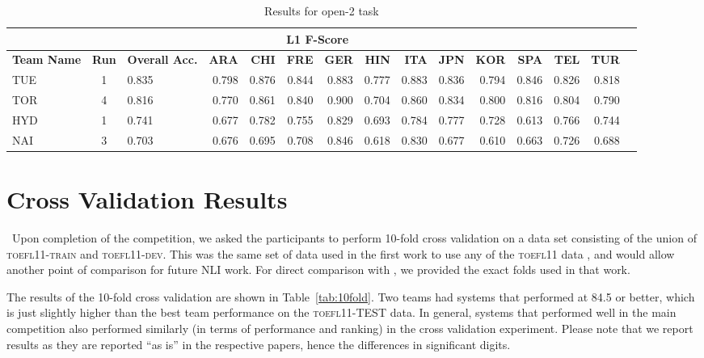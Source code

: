 \documentclass[11pt,letterpaper]{article}
\begin{document}
\begin{table*}
\begin{footnotesize}
\begin{tabular}{|p{1cm}|c|p{1cm}|r|r|r|r|r|r|r|r|r|r|r|r|}
\hline
\rowcolor{gray!50}
\multicolumn{3}{|c|}{} & \multicolumn{11}{c|}{\bf L1 F-Score}\\\hline
{\bf Team Name} & {\bf Run} & {\bf Overall Acc.} & {\bf ARA} & {\bf CHI} & {\bf FRE} & {\bf GER} & {\bf HIN} & {\bf ITA} & {\bf JPN} & {\bf KOR} & {\bf SPA} & {\bf TEL} & {\bf TUR}\\\hline
TUE & 1  & 0.835 & 0.798 & 0.876 & 0.844 & 0.883 & 0.777 & 0.883 & 0.836 & 0.794 & 0.846 & 0.826 & 0.818\\\hline
TOR& 4  & 0.816 & 0.770 & 0.861 & 0.840 & 0.900 & 0.704 & 0.860 & 0.834 & 0.800 & 0.816 & 0.804 & 0.790\\\hline
HYD & 1  & 0.741 & 0.677 & 0.782 & 0.755 & 0.829 & 0.693 & 0.784 & 0.777 & 0.728 & 0.613 & 0.766 & 0.744\\\hline
NAI & 3  & 0.703 & 0.676 & 0.695 & 0.708 & 0.846 & 0.618 & 0.830 & 0.677 & 0.610 & 0.663 & 0.726 & 0.688\\\hline
\end{tabular}
\caption{Results for open-2 task\label{tab:results:open2}}
\end{footnotesize}
\end{table*}







\section{Cross Validation Results}
\
Upon completion of the competition, we asked the participants to
perform 10-fold cross validation on a data set consisting of the union
of \textsc{toefl11-train} and \textsc{toefl11-dev}.  This was the same set of data
used in the first work to use any of the \textsc{toefl11} data
\cite{tetreault-EtAl:2012:PAPERS}, and would allow another point of
comparison for future NLI work.  For direct comparison with
, we provided the exact folds used in
that work.

The results of the 10-fold cross validation are shown in Table~\ref{tab:10fold}.
Two teams had systems that performed at 84.5 or better, which is just
slightly higher than the best team performance on the \textsc{toefl11-TEST} data.  In
general, systems that performed well in the main competition also
performed similarly (in terms of performance and ranking) in the
cross validation experiment.  Please note that we report results as they
are reported ``as is'' in the respective papers, hence the differences in
significant digits.
\end{document}
